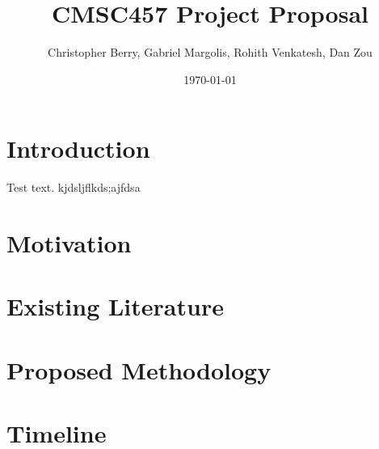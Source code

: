 \documentclass[letter,draft]{article}
\title{CMSC457 Project Proposal}
\author{Christopher Berry, Gabriel Margolis, Rohith Venkatesh, Dan Zou}
\date{\today}
\begin{document}
\maketitle

\section{Introduction}
Test text\cite{rebentrost_quantum_2014}. kjdsljflkds;ajfdsa \cite{lloyd_quantum_2013}


\section{Motivation}
\section{Existing Literature}
\section{Proposed Methodology}
\section{Timeline}
\printbibliography
\end{document}
